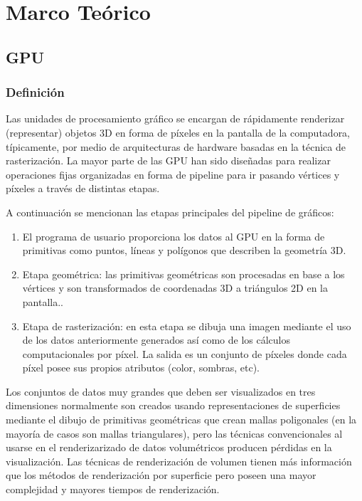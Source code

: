 \chapter{Marco Teórico}%

\section{GPU}
\subsection{Definición}

Las unidades de procesamiento gráfico se encargan de rápidamente renderizar (representar) objetos 3D en forma de píxeles en la pantalla de la computadora, típicamente, por medio de arquitecturas de hardware basadas en la técnica de rasterización. La mayor parte de las GPU han sido diseñadas para realizar operaciones fijas organizadas en forma de pipeline para ir pasando vértices y píxeles a través de distintas etapas.  

A continuación se mencionan las etapas principales del pipeline de gráficos:
\begin{enumerate}

\item El programa de usuario proporciona los datos al GPU en la forma de primitivas como puntos, líneas y polígonos que describen la geometría 3D. 
\item Etapa geométrica: las primitivas geométricas son procesadas en base a los vértices y son transformados de coordenadas 3D a triángulos 2D en la pantalla.. 
\item Etapa de rasterización: en esta etapa se dibuja una imagen mediante el uso de los datos anteriormente generados así como de los cálculos computacionales por píxel. La salida es un conjunto de píxeles donde cada píxel posee sus propios atributos (color, sombras, etc).  

\end{enumerate}

Los conjuntos de datos muy grandes que deben ser visualizados en tres dimensiones normalmente son creados usando representaciones de superficies mediante el dibujo de primitivas geométricas que crean mallas poligonales (en la mayoría de casos son mallas triangulares), pero las técnicas convencionales al usarse en el renderizarizado de datos volumétricos producen pérdidas en la visualización. Las técnicas de  renderización de volumen tienen más información que los métodos de renderización por superficie pero poseen una mayor complejidad y mayores tiempos de renderización.



